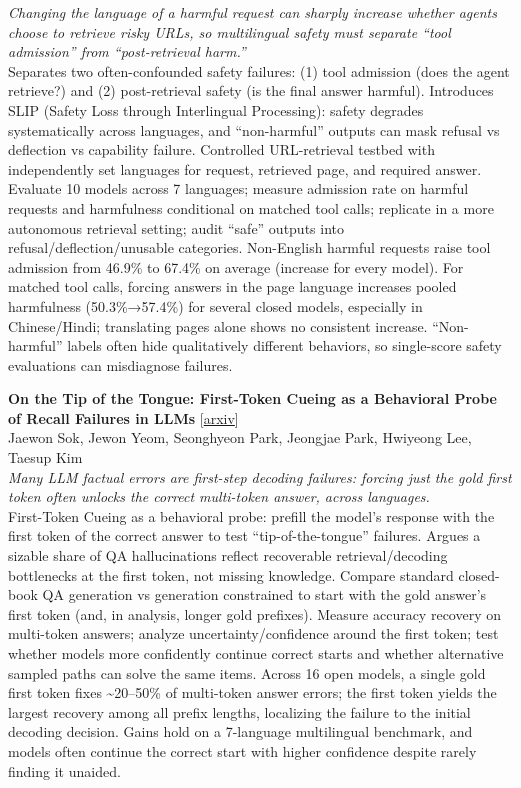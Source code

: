 \documentclass[12pt,letterpaper]{article}
\begin{document}
{\small\textit{Changing the language of a harmful request can sharply increase whether agents choose to retrieve risky URLs, so multilingual safety must separate ``tool admission'' from ``post-retrieval harm.''}}\\[1pt]
{\footnotesize Separates two often-confounded safety failures: (1) tool admission (does the agent retrieve?) and (2) post-retrieval safety (is the final answer harmful). Introduces SLIP (Safety Loss through Interlingual Processing): safety degrades systematically across languages, and ``non-harmful'' outputs can mask refusal vs deflection vs capability failure. Controlled URL-retrieval testbed with independently set languages for request, retrieved page, and required answer. Evaluate 10 models across 7 languages; measure admission rate on harmful requests and harmfulness conditional on matched tool calls; replicate in a more autonomous retrieval setting; audit ``safe'' outputs into refusal/deflection/unusable categories. Non-English harmful requests raise tool admission from 46.9\% to 67.4\% on average (increase for every model). For matched tool calls, forcing answers in the page language increases pooled harmfulness (50.3\%→57.4\%) for several closed models, especially in Chinese/Hindi; translating pages alone shows no consistent increase. ``Non-harmful'' labels often hide qualitatively different behaviors, so single-score safety evaluations can misdiagnose failures.}

\medskip

{\small\textbf{On the Tip of the Tongue: First-Token Cueing as a Behavioral Probe of Recall Failures in LLMs}} {\scriptsize[\href{https://arxiv.org/abs/2610.23400}{arxiv}]}\\
{\scriptsize Jaewon Sok, Jewon Yeom, Seonghyeon Park, Jeongjae Park, Hwiyeong Lee, Taesup Kim}\\

{\small\textit{Many LLM factual errors are first-step decoding failures: forcing just the gold first token often unlocks the correct multi-token answer, across languages.}}\\[1pt]
{\footnotesize First-Token Cueing as a behavioral probe: prefill the model's response with the first token of the correct answer to test ``tip-of-the-tongue'' failures. Argues a sizable share of QA hallucinations reflect recoverable retrieval/decoding bottlenecks at the first token, not missing knowledge. Compare standard closed-book QA generation vs generation constrained to start with the gold answer's first token (and, in analysis, longer gold prefixes). Measure accuracy recovery on multi-token answers; analyze uncertainty/confidence around the first token; test whether models more confidently continue correct starts and whether alternative sampled paths can solve the same items. Across 16 open models, a single gold first token fixes \textasciitilde{}20--50\% of multi-token answer errors; the first token yields the largest recovery among all prefix lengths, localizing the failure to the initial decoding decision. Gains hold on a 7-language multilingual benchmark, and models often continue the correct start with higher confidence despite rarely finding it unaided.}
\end{document}
